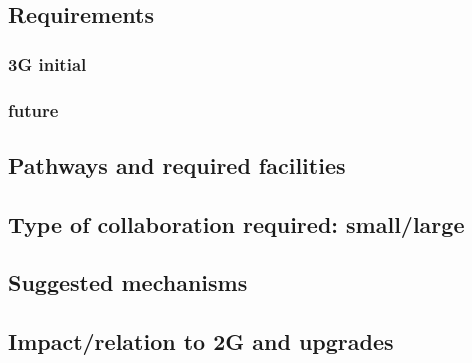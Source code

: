 \subsection{Requirements}
\subsubsection{3G initial}
\subsubsection{future}
\subsection{Pathways and required facilities}
\subsection{Type of collaboration required:  small/large}
\subsection{Suggested mechanisms}
\subsection{Impact/relation to 2G and upgrades}
